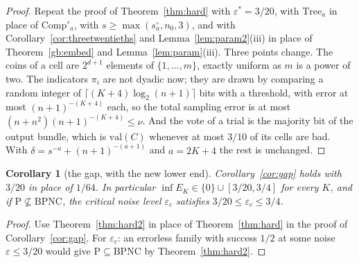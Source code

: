 \documentclass[11pt]{amsart}
\newtheorem{corollary}[theorem]{Corollary}
\theoremstyle{definition}
\theoremstyle{remark}
\newcommand{\eps}{\varepsilon}
\newcommand{\val}{\mathrm{val}}
\newcommand{\Comp}{\mathrm{Comp}}
\begin{document}
\begin{proof}
Repeat the proof of Theorem~\ref{thm:hard} with $\eps^*=3/20$, with $\mathrm{Tree}_a$ in place of
$\Comp'_a$, with $s\ge\max(s^\circ_a,n_0,3)$, and with Corollary~\ref{cor:threetwentieths} and
Lemma~\ref{lem:param2}(iii) in place of Theorem~\ref{gb:embed} and
Lemma~\ref{lem:param}(iii). Three points change. The coins of a cell are $2^{d+1}$ elements of
$\{1,\dots,m\}$, exactly uniform as $m$ is a power of two. The indicators $\pi_i$ are not dyadic
now; they are drawn by comparing a random integer of $\lceil(K+4)\log_2(n+1)\rceil$ bits with a
threshold, with error at most $(n+1)^{-(K+4)}$ each, so the total sampling error is at most
$(n+n^2)(n+1)^{-(K+4)}\le\nu$. And the vote of a trial is the majority bit of the output bundle,
which is $\val(C)$ whenever at most $3/10$ of its cells are bad. With
$\delta=s^{-a}+(n+1)^{-(a+1)}$ and $a=2K+4$ the rest is unchanged.
\end{proof}

\begin{corollary}[the gap, with the new lower end]\label{cor:gap2}
Corollary~\ref{cor:gap} holds with $3/20$ in place of $1/64$. In particular
$\inf E_K\in\{0\}\cup[3/20,3/4]$ for every $K$, and if
$\mathrm P\not\subseteq\mathrm{BPNC}$, the critical noise level $\eps_c$ satisfies
$3/20\le\eps_c\le3/4$.
\end{corollary}

\begin{proof}
Use Theorem~\ref{thm:hard2} in place of Theorem~\ref{thm:hard} in the proof of
Corollary~\ref{cor:gap}. For $\eps_c$: an errorless family with success $1/2$ at some noise
$\eps\le3/20$ would give $\mathrm P\subseteq\mathrm{BPNC}$ by Theorem~\ref{thm:hard2}.
\end{proof}
\end{document}
